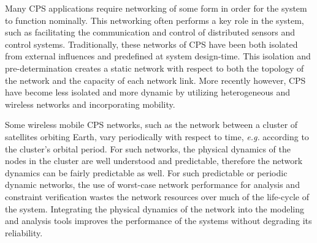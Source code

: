 Many CPS applications require networking of some form in order for the
system to function nominally.  This networking often performs a key
role in the system, such as facilitating the communication and control
of distributed sensors and control systems.  Traditionally, these
networks of CPS have been both isolated from external influences and
predefined at system design-time.  This isolation and
pre-determination creates a static network with respect to both the
topology of the network and the capacity of each network link.  More
recently however, CPS have become less isolated and more dynamic by
utilizing heterogeneous and wireless networks and incorporating
mobility.


Some wireless mobile CPS networks, such as the network between a
cluster of satellites orbiting Earth,
vary periodically with respect to time, \emph{e.g.} according to the
cluster's orbital period.  For such networks, the physical dynamics of
the nodes in the cluster are well understood and predictable,
therefore the network dynamics can be fairly predictable as well.  For
such predictable or periodic dynamic networks, the use of worst-case
network performance for analysis and constraint verification wastes
the network resources over much of the life-cycle of the
system. Integrating the physical dynamics of the network into the
modeling and analysis tools improves the performance of the systems
without degrading its reliability.



